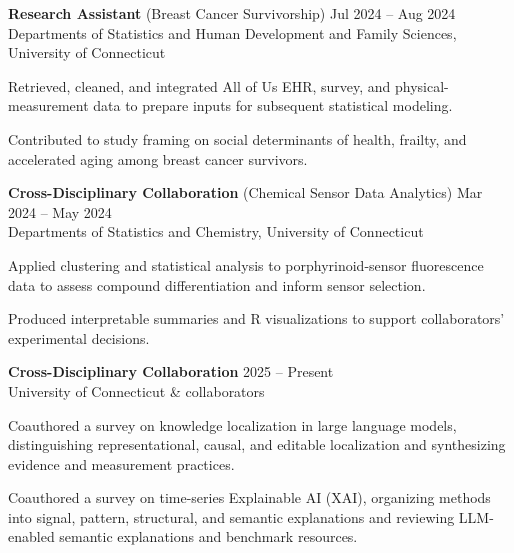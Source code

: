 \documentclass[a4paper,10pt]{article}
\newcommand{\majoritemsep}{\vspace{4pt}}
\newenvironment{reslist}[1][0pt]{%
  \begin{list}{}{%
    \setlength{\leftmargin}{0pt}%
    \setlength{\rightmargin}{0pt}%
    \setlength{\labelwidth}{0pt}%
    \setlength{\labelsep}{0pt}%
    \setlength{\itemindent}{0pt}%
    \setlength{\listparindent}{0pt}%
    \setlength{\itemsep}{#1}%
    \setlength{\topsep}{0pt}%
    \setlength{\parsep}{0pt}%
    \setlength{\partopsep}{0pt}%
  }%
}{\end{list}}
\newenvironment{bulletlist}[1][0pt]{%
  \begin{list}{\textbullet}{%
    \setlength{\leftmargin}{14pt}%
    \setlength{\rightmargin}{0pt}%
    \setlength{\labelwidth}{8pt}%
    \setlength{\labelsep}{6pt}%
    \setlength{\itemindent}{0pt}%
    \setlength{\listparindent}{0pt}%
    \setlength{\itemsep}{#1}%
    \setlength{\topsep}{2pt}%
    \setlength{\parsep}{0pt}%
    \setlength{\partopsep}{0pt}%
  }%
}{\end{list}}
\begin{document}
\begin{reslist}[6pt]
  \item \textbf{Research Assistant} (Breast Cancer Survivorship) \hfill Jul 2024 -- Aug 2024 \\
  Departments of Statistics and Human Development and Family Sciences, University of Connecticut
  \begin{bulletlist}[2pt]
    \item Retrieved, cleaned, and integrated All of Us EHR, survey, and physical-measurement data to prepare inputs for subsequent statistical modeling.
    \item Contributed to study framing on social determinants of health, frailty, and accelerated aging among breast cancer survivors.
  \end{bulletlist}

  \begin{samepage}
  \item \textbf{Cross-Disciplinary Collaboration} (Chemical Sensor Data Analytics) \hfill Mar 2024 -- May 2024 \\
  Departments of Statistics and Chemistry, University of Connecticut
  \begin{bulletlist}[2pt]
    \item Applied clustering and statistical analysis to porphyrinoid-sensor fluorescence data to assess compound differentiation and inform sensor selection.
    \item Produced interpretable summaries and R visualizations to support collaborators' experimental decisions.
  \end{bulletlist}
  \end{samepage}

  \item \textbf{Cross-Disciplinary Collaboration} \hfill 2025 -- Present \\
  University of Connecticut \& collaborators
  \begin{bulletlist}[2pt]
    \item Coauthored a survey on knowledge localization in large language models, distinguishing representational, causal, and editable localization and synthesizing evidence and measurement practices.
    \item Coauthored a survey on time-series Explainable AI (XAI), organizing methods into signal, pattern, structural, and semantic explanations and reviewing LLM-enabled semantic explanations and benchmark resources.
  \end{bulletlist}

\end{reslist}
\majoritemsep
\end{document}
